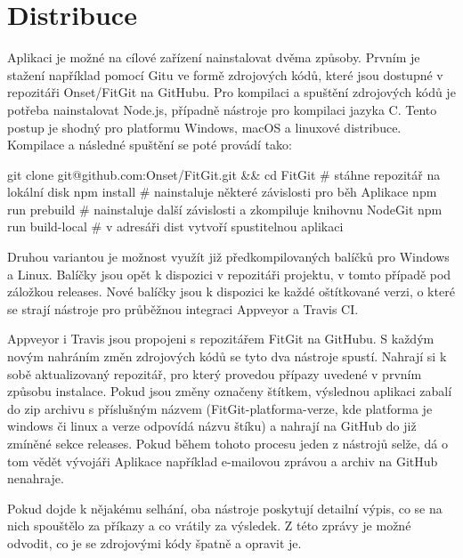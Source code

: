 \chapter{Distribuce}

Aplikaci je možné na cílové zařízení nainstalovat dvěma způsoby. Prvním je stažení například pomocí Gitu ve formě zdrojových kódů, které jsou dostupné v repozitáři Onset/FitGit na GitHubu. Pro kompilaci a spuštění zdrojových kódů je potřeba nainstalovat Node.js, případně nástroje pro kompilaci jazyka C. Tento postup je shodný pro platformu Windows, macOS a linuxové distribuce. Kompilace a následné spuštění se poté provádí tako:

git clone git@github.com:Onset/FitGit.git \&\& cd FitGit \# stáhne repozitář na lokální disk
npm install \# nainstaluje některé závislosti pro běh Aplikace
npm run prebuild \# nainstaluje další závislosti a zkompiluje knihovnu NodeGit
npm run build-local \# v adresáři dist vytvoří spustitelnou aplikaci

Druhou variantou je možnost využít již předkompilovaných balíčků pro Windows a Linux. Balíčky jsou opět k dispozici v repozitáři projektu, v tomto případě pod záložkou releases. Nové balíčky jsou k dispozici ke každé oštítkované verzi, o které se strají nástroje pro průběžnou integraci Appveyor a Travis CI.

Appveyor i Travis jsou propojeni s repozitářem FitGit na GitHubu. S každým novým nahráním změn zdrojových kódů se tyto dva nástroje spustí. Nahrají si k sobě aktualizovaný repozitář, pro který provedou přípazy uvedené v prvním způsobu instalace. Pokud jsou změny označeny štítkem, výslednou aplikaci zabalí do zip archivu s příslušným názvem (FitGit-platforma-verze, kde platforma je windows či linux a verze odpovídá názvu štíku) a nahrají na GitHub do již zmíněné sekce releases. Pokud během tohoto procesu jeden z nástrojů selže, dá o tom vědět vývojáři Aplikace například e-mailovou zprávou a archiv na GitHub nenahraje.

Pokud dojde k nějakému selhání, oba nástroje poskytují detailní výpis, co se na nich spouštělo za příkazy a co vrátily za výsledek. Z této zprávy je možné odvodit, co je se zdrojovými kódy špatně a opravit je.
